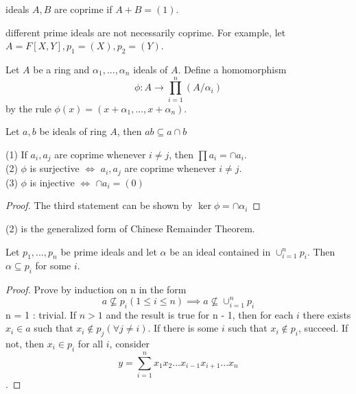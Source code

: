 \documentclass[11pt,fleqn]{book} %
\begin{document}
\begin{CJK}{UTF8}{gkai}
\begin{definition}
	[coprime] ideals $A,B$ are coprime if $A + B = (1)$.
\end{definition}
\begin{remark}
	different prime ideals are not necessarily coprime. For example, let $A = F[X, Y], p_1 = (X), p_2 = (Y)$.	
\end{remark}

\begin{definition}
	Let $A$ be a ring and $\alpha_1, ... ,\alpha_n$ ideals of $A$. Define a homomorphism
\[\phi: A \to \prod_{i=1}^n(A/\alpha_i)\]
by the rule $\phi(x) = (x+\alpha_1,...,x+\alpha_n)$.

\end{definition}
\begin{remark}
	Let $a, b$ be ideals of ring $A$, then $ab \subseteq a \cap b$
\end{remark}

\begin{proposition}
	(1) If $a_i, a_j$ are coprime whenever $i\neq j$, then $\prod a_i = \cap a_i$. \\
	(2) $\phi$ is surjective $\iff$ $a_i, a_j$ are coprime whenever $i\neq j$. \\
	(3) $\phi$ is injective $\iff$ $\cap a_i = (0)$
\end{proposition}
\begin{proof}
	The third statement can be shown by $\ker \phi = \cap \alpha_i$
\end{proof}
\begin{remark}
	(2) is the generalized form of Chinese Remainder Theorem.	
\end{remark}

\begin{proposition}
	Let $p_1, ... , p_n$ be prime ideals and let $\alpha$ be an ideal contained in $\cup_{i=1}^n p_i$. Then $\alpha \subseteq p_i$ for some $i$. 
\end{proposition}
\begin{proof}
	Prove by induction on n in the form 
	\[a \nsubseteq p_i (1\leq i \leq n) \implies a\nsubseteq \cup_{i=1}^n p_i\]
	n = 1 : trivial. If $n>1$ and the result is true for n - 1, then for each $i$ there exists $x_i \in a$ such that $x_i \notin p_j(\forall j\neq i)$. If there is some $i$ such that $x_i \notin p_i$, succeed. If not, then $x_i \in p_i$ for all $i$,
	consider
	\[y = \sum_{i=1}^{n}x_1x_2...x_{i-1}x_{i+1}...x_n\].
\end{proof}



\end{CJK}
\end{document}
